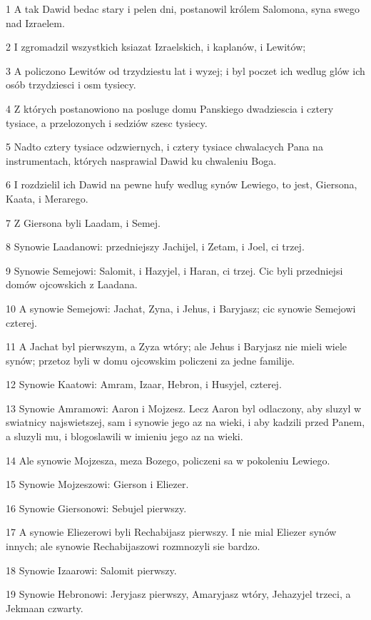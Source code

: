 \par 1 A tak Dawid bedac stary i pelen dni, postanowil królem Salomona, syna swego nad Izraelem.
\par 2 I zgromadzil wszystkich ksiazat Izraelskich, i kaplanów, i Lewitów;
\par 3 A policzono Lewitów od trzydziestu lat i wyzej; i byl poczet ich wedlug glów ich osób trzydziesci i osm tysiecy.
\par 4 Z których postanowiono na posluge domu Panskiego dwadziescia i cztery tysiace, a przelozonych i sedziów szesc tysiecy.
\par 5 Nadto cztery tysiace odzwiernych, i cztery tysiace chwalacych Pana na instrumentach, których nasprawial Dawid ku chwaleniu Boga.
\par 6 I rozdzielil ich Dawid na pewne hufy wedlug synów Lewiego, to jest, Giersona, Kaata, i Merarego.
\par 7 Z Giersona byli Laadam, i Semej.
\par 8 Synowie Laadanowi: przedniejszy Jachijel, i Zetam, i Joel, ci trzej.
\par 9 Synowie Semejowi: Salomit, i Hazyjel, i Haran, ci trzej. Cic byli przedniejsi domów ojcowskich z Laadana.
\par 10 A synowie Semejowi: Jachat, Zyna, i Jehus, i Baryjasz; cic synowie Semejowi czterej.
\par 11 A Jachat byl pierwszym, a Zyza wtóry; ale Jehus i Baryjasz nie mieli wiele synów; przetoz byli w domu ojcowskim policzeni za jedne familije.
\par 12 Synowie Kaatowi: Amram, Izaar, Hebron, i Husyjel, czterej.
\par 13 Synowie Amramowi: Aaron i Mojzesz. Lecz Aaron byl odlaczony, aby sluzyl w swiatnicy najswietszej, sam i synowie jego az na wieki, i aby kadzili przed Panem, a sluzyli mu, i blogoslawili w imieniu jego az na wieki.
\par 14 Ale synowie Mojzesza, meza Bozego, policzeni sa w pokoleniu Lewiego.
\par 15 Synowie Mojzeszowi: Gierson i Eliezer.
\par 16 Synowie Giersonowi: Sebujel pierwszy.
\par 17 A synowie Eliezerowi byli Rechabijasz pierwszy. I nie mial Eliezer synów innych; ale synowie Rechabijaszowi rozmnozyli sie bardzo.
\par 18 Synowie Izaarowi: Salomit pierwszy.
\par 19 Synowie Hebronowi: Jeryjasz pierwszy, Amaryjasz wtóry, Jehazyjel trzeci, a Jekmaan czwarty.
